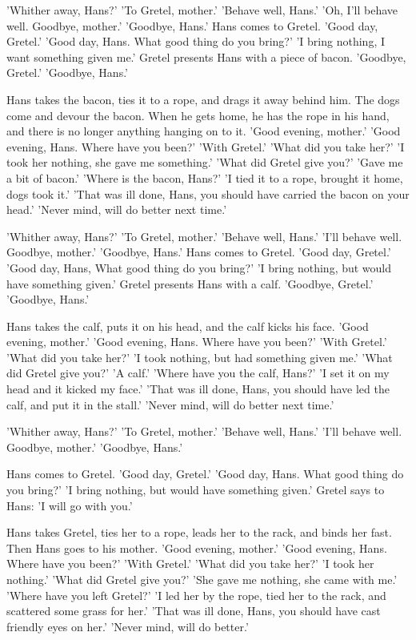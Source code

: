 \documentclass[12pt]{book}
\begin{document}
'Whither away, Hans?' 'To Gretel, mother.' 'Behave well, Hans.' 'Oh,
I'll behave well. Goodbye, mother.' 'Goodbye, Hans.' Hans comes to
Gretel. 'Good day, Gretel.' 'Good day, Hans. What good thing do you
bring?' 'I bring nothing, I want something given me.' Gretel presents
Hans with a piece of bacon. 'Goodbye, Gretel.' 'Goodbye, Hans.'

Hans takes the bacon, ties it to a rope, and drags it away behind him.
The dogs come and devour the bacon. When he gets home, he has the rope
in his hand, and there is no longer anything hanging on to it. 'Good
evening, mother.' 'Good evening, Hans. Where have you been?' 'With
Gretel.' 'What did you take her?' 'I took her nothing, she gave me
something.' 'What did Gretel give you?' 'Gave me a bit of bacon.'
'Where is the bacon, Hans?' 'I tied it to a rope, brought it home,
dogs took it.' 'That was ill done, Hans, you should have carried the
bacon on your head.' 'Never mind, will do better next time.'

'Whither away, Hans?' 'To Gretel, mother.' 'Behave well, Hans.' 'I'll
behave well. Goodbye, mother.' 'Goodbye, Hans.' Hans comes to Gretel.
'Good day, Gretel.' 'Good day, Hans, What good thing do you bring?' 'I
bring nothing, but would have something given.' Gretel presents Hans
with a calf. 'Goodbye, Gretel.' 'Goodbye, Hans.'

Hans takes the calf, puts it on his head, and the calf kicks his face.
'Good evening, mother.' 'Good evening, Hans. Where have you been?'
'With Gretel.' 'What did you take her?' 'I took nothing, but had
something given me.' 'What did Gretel give you?' 'A calf.' 'Where have
you the calf, Hans?' 'I set it on my head and it kicked my face.'
'That was ill done, Hans, you should have led the calf, and put it in
the stall.' 'Never mind, will do better next time.'

'Whither away, Hans?' 'To Gretel, mother.' 'Behave well, Hans.' 'I'll
behave well. Goodbye, mother.' 'Goodbye, Hans.'

Hans comes to Gretel. 'Good day, Gretel.' 'Good day, Hans. What good
thing do you bring?' 'I bring nothing, but would have something
given.' Gretel says to Hans: 'I will go with you.'

Hans takes Gretel, ties her to a rope, leads her to the rack, and
binds her fast. Then Hans goes to his mother. 'Good evening, mother.'
'Good evening, Hans. Where have you been?' 'With Gretel.' 'What did
you take her?' 'I took her nothing.' 'What did Gretel give you?' 'She
gave me nothing, she came with me.' 'Where have you left Gretel?' 'I
led her by the rope, tied her to the rack, and scattered some grass
for her.' 'That was ill done, Hans, you should have cast friendly eyes
on her.' 'Never mind, will do better.'
\end{document}
